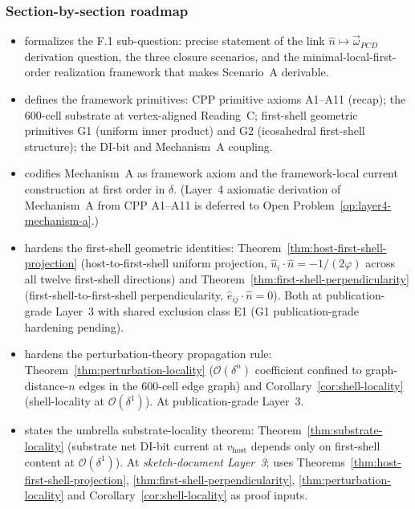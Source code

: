 \documentclass[11pt,letterpaper]{article}
\newcommand{\phig}{\varphi}
\newcommand{\vhost}{v_{\text{host}}}
\newcommand{\omegaPCD}{\vec{\omega}_{PCD}}
\newcommand{\bigO}[1]{\mathcal{O}(#1)}
\begin{document}
\subsubsection*{Section-by-section roadmap}

\begin{itemize}[leftmargin=2em]
\item[\S\ref{sec:subquestion}] formalizes the F.1 sub-question: precise statement of the link $\hat{n} \mapsto \omegaPCD$ derivation question, the three closure scenarios, and the minimal-local-first-order realization framework that makes Scenario~A derivable.
\item[\S\ref{sec:framework-primitives}] defines the framework primitives: CPP primitive axioms A1--A11 (recap); the 600-cell substrate at vertex-aligned Reading~C; first-shell geometric primitives G1 (uniform inner product) and G2 (icosahedral first-shell structure); the DI-bit and Mechanism~A coupling.
\item[\S\ref{sec:mechanism-a}] codifies Mechanism~A as framework axiom and the framework-local current construction at first order in $\delta$. (Layer~4 axiomatic derivation of Mechanism~A from CPP A1--A11 is deferred to Open Problem~\ref{op:layer4-mechanism-a}.)
\item[\S\ref{sec:first-shell-identities}] hardens the first-shell geometric identities: Theorem~\ref{thm:host-first-shell-projection} (host-to-first-shell uniform projection, $\hat{u}_i \cdot \hat{n} = -1/(2\phig)$ across all twelve first-shell directions) and Theorem~\ref{thm:first-shell-perpendicularity} (first-shell-to-first-shell perpendicularity, $\hat{e}_{ij} \cdot \hat{n} = 0$). Both at publication-grade Layer~3 with shared exclusion class E1 (G1 publication-grade hardening pending).
\item[\S\ref{sec:perturbation-locality}] hardens the perturbation-theory propagation rule: Theorem~\ref{thm:perturbation-locality} ($\bigO{\delta^n}$ coefficient confined to graph-distance-$n$ edges in the 600-cell edge graph) and Corollary~\ref{cor:shell-locality} (shell-locality at $\bigO{\delta^1}$). At publication-grade Layer~3.
\item[\S\ref{sec:substrate-locality-theorem}] states the umbrella substrate-locality theorem: Theorem~\ref{thm:substrate-locality} (substrate net DI-bit current at $\vhost$ depends only on first-shell content at $\bigO{\delta^1}$). At \emph{sketch-document Layer~3}; uses Theorems~\ref{thm:host-first-shell-projection}, \ref{thm:first-shell-perpendicularity}, \ref{thm:perturbation-locality} and Corollary~\ref{cor:shell-locality} as proof inputs.

\end{itemize}
\end{document}
